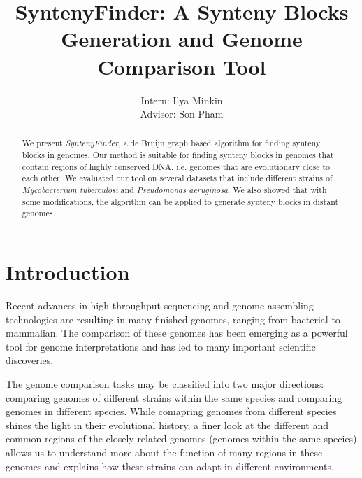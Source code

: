 \documentclass[a4paper, 12pt]{scrartcl}
\begin{document}
\title{SyntenyFinder: A Synteny Blocks Generation and Genome Comparison Tool}
\author{Intern: Ilya Minkin\\
	Advisor: Son Pham}
\date{}
\maketitle
{}

\onehalfspacing

\begin{abstract}
    We present \textit{SyntenyFinder}, a de Bruijn graph based algorithm for finding synteny blocks in genomes. Our 
method is suitable for finding synteny blocks in genomes that contain regions of highly conserved DNA, i.e. genomes that are evolutionary
close to each other. We evaluated our tool on several datasets that include different strains of \textit{Mycobacterium tuberculosi} and 
\textit{Pseudomonas aeruginosa}. We also showed that with some modifications, the algorithm can be applied to generate synteny blocks in
distant genomes. 
\end{abstract}

\section{Introduction}

Recent advances in high throughput sequencing and genome assembling technologies are resulting in many 
finished genomes, ranging from bacterial to mammalian. The comparison of these genomes has been emerging as a powerful
tool for genome interpretations and has led to many important scientific discoveries.

The genome comparison tasks may be classified into two major directions: comparing genomes of different strains within the same species
and comparing genomes in different species. While comapring genomes from different species shines the light in their evolutional history, 
a finer look at the different and common regions of the closely related genomes (genomes within the same species) allows us to understand 
more about the function of many regions in these genomes and explains how these strains can adapt in different environments. 


\end{document}
